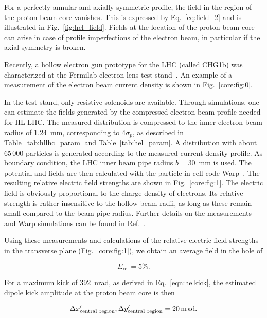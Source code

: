 \documentclass[%
 reprint,
 amsmath,amssymb,
 aps,
prstab,
]{revtex4-1}
\begin{document}
For a perfectly annular and axially symmetric profile, the field in
the region of the proton beam core vanishes. This is expressed by
Eq.~\ref{eq:field_2} and is illustrated in
Fig.~\ref{fig:hel_field}. Fields at the location of the proton beam
core can arise in case of profile imperfections of the electron
beam, in particular if the axial symmetry is broken.

Recently, a hollow electron gun prototype for the LHC (called CHG1b)
was characterized at the Fermilab electron lens test
stand~\cite{hel_test_stand_fnal}. An example of a measurement of the
electron beam current density is shown in Fig.~\ref{core:fig:0}.

In the test stand, only resistive solenoids are available. Through
simulations, one can estimate the fields generated by the compressed
electron beam profile needed for HL-LHC. The measured distribution is
compressed to the inner electron beam radius of 1.24~mm, corresponding
to $4\sigma_p$, as described in Table~\ref{tab:hllhc_param} and
Table~\ref{tab:hel_param}. A distribution with about $65\,000$
particles is generated according to the measured current-density
profile. As boundary condition, the LHC inner beam pipe radius
$b=30$~mm is used. The potential and fields are then calculated with
the particle-in-cell code Warp~\cite{warp}. The resulting relative
electric field strengths are shown in Fig.~\ref{core:fig:1}. The
electric field is obviously proportional to the charge density of
electrons. Its relative strength is rather insensitive to the hollow
beam radii, as long as these remain small compared to the beam pipe
radius. Further details on the measurements and Warp simulations can
be found in Ref.~\cite{hel_res_field_stancari_2017}.

Using these measurements and calculations of the relative electric
field strengths in the transverse plane (Fig.~\ref{core:fig:1}), we
obtain an average field in the hole of

\begin{equation}
  E_{\mathrm{rel}}= 5\%.
\end{equation}

For a maximum kick of 392~nrad, as derived in Eq.~\ref{eqn:helkick},
the estimated dipole kick amplitude at the proton beam core is then

\begin{equation}
  \label{eqn:kick_central}
  \Delta x'_{\rm{central \ region}}, \Delta y'_{\rm{central \ region}} = \SI{20}{nrad}.
\end{equation}
\end{document}
